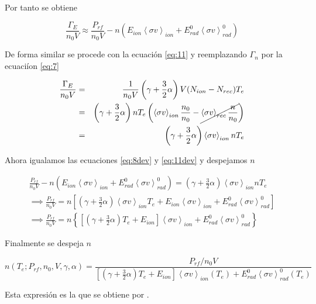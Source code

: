   Por tanto se obtiene
  
  \begin{equation}\label{eq:8dev}
    \frac{\Gamma_{E}}{n_0V} \approx \frac{P_{rf}}{n_0V} -n (E_{ion}\left<\sigma v\right>_{ion} + E_{rad}^0\left<\sigma v\right>_{rad}^0)
  \end{equation}

  De forma similar se procede con la ecuaci\'on \eqref{eq:11} y reemplazando $\Gamma_n$ por la ecuaci\'ion \eqref{eq:7}

  \begin{eqnarray}\label{eq:11dev}
    \frac{\Gamma_E}{n_0 V} &=& \frac{1}{n_0V} \left(\gamma + \frac{3}{2}\alpha\right)V(N_{ion} - N_{rec})T_e \nonumber\\
                           &=& \left(\gamma + \frac{3}{2}\alpha\right)nT_e \left(\left<\sigma v\right>_{ion}\frac{n_0}{n_0} - \cancel{\left<\sigma v\right>_{rec}\frac{n}{n_0}}\right) \nonumber \\
                           &=& \left(\gamma + \frac{3}{2}\alpha\right)\left<\sigma v\right>_{ion}nT_e
  \end{eqnarray}

  Ahora igualamos las ecuaciones \eqref{eq:8dev} y \eqref{eq:11dev} y despejamos $n$

  \begin{eqnarray*}
    \frac{P_{rf}}{n_0V} -n (E_{ion}\left<\sigma v\right>_{ion} + E_{rad}^0\left<\sigma v\right>_{rad}^0) = \left(\gamma + \frac{3}{2}\alpha\right)\left<\sigma v\right>_{ion}nT_e \\ \implies \frac{P_{rf}}{n_0V} = n \left[\left(\gamma + \frac{3}{2}\alpha\right)\left<\sigma v\right>_{ion}T_e + E_{ion}\left<\sigma v\right>_{ion} + E_{rad}^0\left<\sigma v\right>_{rad}^0\right] \\
    \implies \frac{ P_{rf} }{n_0V} = n \left\{ \left[ \left(\gamma + \frac{3}{2}\alpha\right)T_e + E_{ion}\right] \left<\sigma v\right>_{ion} + E_{rad}^0\left<\sigma v\right>_{rad}^0 \right\}
  \end{eqnarray*}

  Finalmente se despeja $n$

  \begin{equation}
    n(T_e; P_{rf}, n_0, V, \gamma, \alpha) = \frac{P_{rf}/n_0V}{\left[ \left(\gamma + \frac{3}{2}\alpha\right)T_e + E_{ion}\right] \left<\sigma v\right>_{ion}(T_e) + E_{rad}^0\left<\sigma v\right>_{rad}^0(T_e)}
  \end{equation}

  Esta expresi\'on es la que se obtiene por \cite{lechte2002}.

  
  
  
